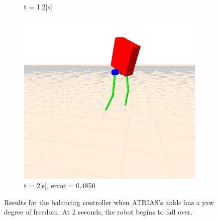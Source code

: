 \documentclass[letterpaper, 10 pt, conference]{ieeeconf}  %
\begin{document}
\begin{figure}[tbp]
\begin{subfigure}[b]{0.3\textwidth}
        \caption{t = 1.2[s]}
        \label{fig:balanceYaw2}
    \end{subfigure} \hfill
    \begin{subfigure}[b]{0.3\textwidth}
      \centering
        \includegraphics[width=\textwidth] {figures/balanceYaw3.jpg}
        \caption{t = 2[s], error = 0.4850}
        \label{fig:balanceYaw3}
    \end{subfigure}
  \caption{Results for the balancing controller when ATRIAS's ankle has a yaw degree of freedom. At 2 seconds, the robot begins to fall over.}
  \label{fig:balancing}
\end{figure}
\end{document}
